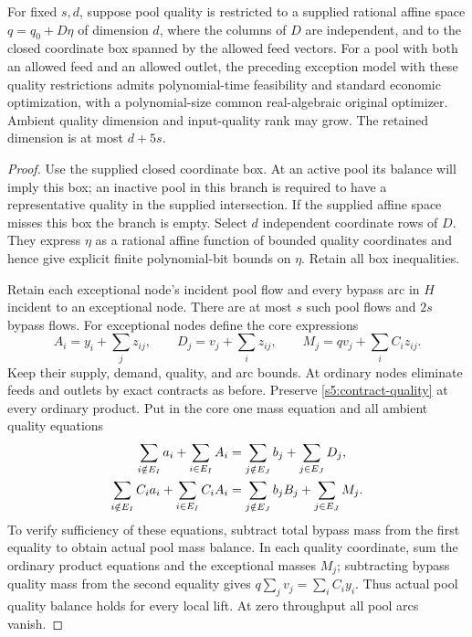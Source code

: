 \begin{lemma}
\label{s5:quality-chart}
For fixed $s,d$, suppose pool quality is restricted to a supplied rational
affine space $q=q_0+D\eta$ of dimension $d$, where the columns of $D$
are independent, and to the closed coordinate box spanned by the allowed
feed vectors. For a pool with both an allowed feed and an allowed outlet,
the preceding exception model with these quality restrictions admits polynomial-time
feasibility and standard economic optimization, with a polynomial-size
common real-algebraic original optimizer. Ambient quality dimension and
input-quality rank may grow. The retained dimension is at most $d+5s$.
\end{lemma}
\begin{proof}
Use the supplied closed coordinate box. At an active pool its balance
will imply this box; an inactive pool in this branch is required to have
a representative quality in the supplied intersection. If the
supplied affine space misses this box the branch is empty. Select $d$
independent coordinate rows of $D$. They express $\eta$ as a rational
affine function of bounded quality coordinates and hence give explicit
finite polynomial-bit bounds on $\eta$. Retain all box inequalities.

Retain each exceptional node's incident pool flow and every bypass arc
in $H$ incident to an exceptional node. There are at most $s$ such
pool flows and $2s$ bypass flows. For exceptional nodes define the core
expressions
\[
 A_i=y_i+\sum_jz_{ij},\qquad
 D_j=v_j+\sum_i z_{ij},\qquad M_j=qv_j+\sum_iC_i z_{ij}.
\]
Keep their supply, demand, quality, and arc bounds. At ordinary nodes
eliminate feeds and outlets by exact contracts as before. Preserve
\eqref{s5:contract-quality} at every ordinary product. Put in the core
one mass equation and all ambient quality equations
\begin{align}
 \sum_{i\notin E_I}a_i+\sum_{i\in E_I}A_i
 &=\sum_{j\notin E_J}b_j+\sum_{j\in E_J}D_j,\notag\\
 \sum_{i\notin E_I}C_i a_i+\sum_{i\in E_I}C_i A_i
 &=\sum_{j\notin E_J}b_jB_j+\sum_{j\in E_J}M_j.
 \label{s5:exception-balances}
\end{align}
To verify sufficiency of these equations, subtract total bypass mass
from the first equality to obtain actual pool mass balance. In each
quality coordinate, sum the ordinary product equations and the
exceptional masses $M_j$; subtracting bypass quality mass from the
second equality gives
$q\sum_jv_j=\sum_iC_i y_i$. Thus actual pool quality balance holds
for every local lift. At zero throughput all pool arcs vanish.


\end{proof}

